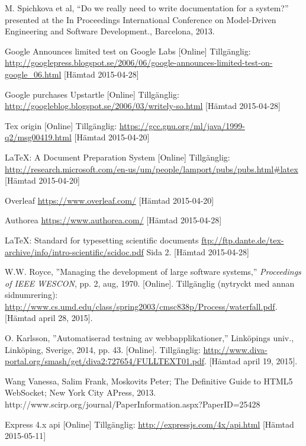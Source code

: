 \begin{thebibliography}{9}
M. Spichkova et al, “Do we really need to write documentation for a system?” presented at the In Proceedings International Conference on Model-Driven Engineering and Software Development., Barcelona, 2013.

Google Announces limited test on Google Labs [Online] Tillgänglig: 
\url{http://googlepress.blogspot.se/2006/06/google-announces-limited-test-on-google_06.html} [Hämtad 2015-04-28]

Google purchases Upstartle [Online] Tillgänglig: 
\url{http://googleblog.blogspot.se/2006/03/writely-so.html} [Hämtad 2015-04-28]

Tex origin [Online] Tillgänglig: 
\url{https://gcc.gnu.org/ml/java/1999-q2/msg00419.html} [Hämtad 2015-04-20]

LaTeX: A Document Preparation System [Online] Tillgänglig: 
\url{http://research.microsoft.com/en-us/um/people/lamport/pubs/pubs.html#latex} [Hämtad 2015-04-20]

Overleaf 
\url{https://www.overleaf.com/} [Hämtad 2015-04-20]

Authorea 
\url{https://www.authorea.com/} [Hämtad 2015-04-28]
 
LaTeX: Standard for typesetting scientific documents
\url{ftp://ftp.dante.de/tex-archive/info/intro-scientific/scidoc.pdf} Sida 2. [Hämtad 2015-04-28]

W.W. Royce, ''Managing the development of large software systems,''
\textit{Proceedings of IEEE WESCON}, pp. 2, aug, 1970.
[Online].
Tillgänglig (nytryckt med annan sidnumrering):
\url{http://www.cs.umd.edu/class/spring2003/cmsc838p/Process/waterfall.pdf}.
[Hämtad april 28, 2015].

O. Karlsson, ''Automatiserad testning av webbapplikationer,''
Linköpings univ., Linköping, Sverige, 2014, pp. 43.
[Online]. 
Tillgänglig: 
\url{http://www.diva-portal.org/smash/get/diva2:727654/FULLTEXT01.pdf}.
[Hämtad april 19, 2015].

 Wang Vanessa, Salim Frank, Moskovits Peter; The Definitive Guide to HTML5 WebSocket; New York City APress, 2013.
 http://www.scirp.org/journal/PaperInformation.aspx?PaperID=25428

Express 4.x api [Online] Tillgänglig: 
\url{http://expressjs.com/4x/api.html} [Hämtad 2015-05-11]


\end{thebibliography}

